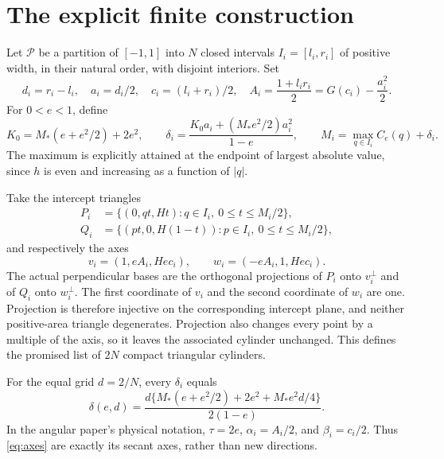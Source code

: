 \documentclass[11pt]{amsart}
\theoremstyle{definition}
\theoremstyle{remark}
\begin{document}
\section{The explicit finite construction}\label{sec:construction}

Let $\mathcal P$ be a partition of $[-1,1]$ into $N$ closed intervals
$I_i=[l_i,r_i]$ of positive width, in their natural order, with disjoint
interiors. Set
\begin{equation}\label{eq:cell-data}
 d_i=r_i-l_i,\quad a_i=d_i/2,\quad c_i=(l_i+r_i)/2,
 \quad A_i=\frac{1+l_ir_i}{2}=G(c_i)-\frac{a_i^2}{2}.
\end{equation}
For $0<e<1$, define
\begin{equation}\label{eq:local-padding}
 K_0=M_*(e+e^2/2)+2e^2,\qquad
 \delta_i=\frac{K_0a_i+(M_*e^2/2)a_i^2}{1-e},\qquad
 M_i=\max_{q\in I_i}C_e(q)+\delta_i.
\end{equation}
The maximum is explicitly attained at the endpoint of largest absolute
value, since $h$ is even and increasing as a function of $|q|$.

Take the intercept triangles
\begin{equation}\label{eq:intercepts}
\begin{split}
 P_i&=\{(0,qt,Ht):q\in I_i,\ 0\le t\le M_i/2\},\\
 Q_i&=\{(pt,0,H(1-t)):p\in I_i,\ 0\le t\le M_i/2\},
\end{split}
\end{equation}
and respectively the axes
\begin{equation}\label{eq:axes}
 v_i=(1,eA_i,Hec_i),\qquad w_i=(-eA_i,1,Hec_i).
\end{equation}
The actual perpendicular bases are the orthogonal projections of $P_i$
onto $v_i^\perp$ and of $Q_i$ onto $w_i^\perp$. The first coordinate of
$v_i$ and the second coordinate of $w_i$ are one. Projection is therefore
injective on the corresponding intercept plane, and neither positive-area
triangle degenerates. Projection also changes every point by a multiple
of the axis, so it leaves the associated cylinder unchanged. This defines
the promised list of $2N$ compact triangular cylinders.

For the equal grid $d=2/N$, every $\delta_i$ equals
\begin{equation}\label{eq:uniform-padding}
 \delta(e,d)=
 \frac{d\{M_*(e+e^2/2)+2e^2+M_*e^2d/4\}}{2(1-e)}.
\end{equation}
In the angular paper's physical notation, $\tau=2e$,
$\alpha_i=A_i/2$, and $\beta_i=c_i/2$. Thus \eqref{eq:axes} are
exactly its secant axes, rather than new directions.
\end{document}
